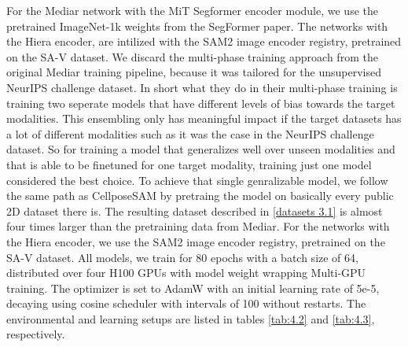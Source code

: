 For the Mediar network with the MiT Segformer encoder module, we use the pretrained ImageNet-1k weights from the SegFormer paper. The networks with the Hiera encoder, are intilized with the SAM2 image encoder registry, pretrained on the SA-V dataset. We discard the multi-phase training approach from the original Mediar training pipeline, because it was tailored for the unsupervised NeurIPS challenge dataset. In short what they do in their multi-phase training is training two seperate models that have different levels of bias towards the target modalities. This ensembling only has meaningful impact if the target datasets has a lot of different modalities such as it was the case in the NeurIPS challenge dataset. So for training a model that generalizes well over unseen modalities and that is able to be finetuned for one target modality, training just one model considered the best choice. To achieve that single genralizable model, we follow the same path as CellposeSAM by pretraing the model on basically every public 2D dataset there is. The resulting dataset described in \ref{datasets 3.1} is almost four times larger than the pretraining data from Mediar. For the networks with the Hiera encoder, we use the SAM2 image encoder registry, pretrained on the SA-V dataset.
All models, we train for 80 epochs with a batch size of 64, distributed over four H100 GPUs with model weight wrapping Multi-GPU training. The optimizer is set to AdamW with an initial learning rate of 5e-5, decaying using cosine scheduler with intervals of 100 without restarts. The environmental and learning setups are listed in tables \ref{tab:4.2} and \ref{tab:4.3}, respectively. 

